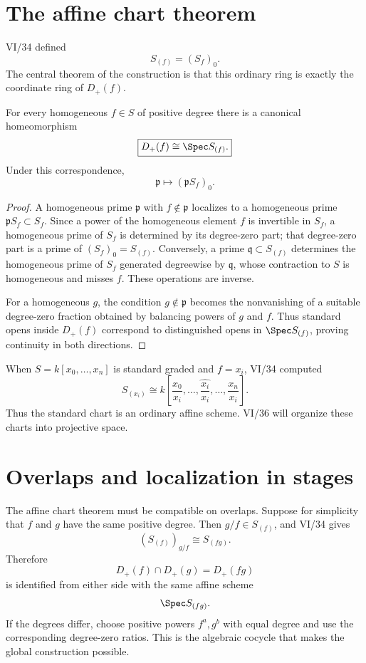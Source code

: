 \section{The affine chart theorem}
VI/34 defined
\[
S_{(f)}=(S_f)_0.
\]
The central theorem of the construction is that this ordinary ring is exactly the coordinate ring of \(D_+(f)\).

\begin{theorem}\label{thm:vi35-affine-chart}
For every homogeneous \(f\in S\) of positive degree there is a canonical homeomorphism
\[
\boxed{D_+(f)\cong\Spec S_{(f)}.}
\]
Under this correspondence,
\[
\mathfrak p\longmapsto (\mathfrak p S_f)_0.
\]
\end{theorem}

\begin{proof}
A homogeneous prime \(\mathfrak p\) with \(f\notin\mathfrak p\) localizes to a homogeneous prime \(\mathfrak pS_f\subset S_f\).  Since a power of the homogeneous element \(f\) is invertible in \(S_f\), a homogeneous prime of \(S_f\) is determined by its degree-zero part; that degree-zero part is a prime of \((S_f)_0=S_{(f)}\).  Conversely, a prime \(\mathfrak q\subset S_{(f)}\) determines the homogeneous prime of \(S_f\) generated degreewise by \(\mathfrak q\), whose contraction to \(S\) is homogeneous and misses \(f\).  These operations are inverse.

For a homogeneous \(g\), the condition \(g\notin\mathfrak p\) becomes the nonvanishing of a suitable degree-zero fraction obtained by balancing powers of \(g\) and \(f\).  Thus standard opens inside \(D_+(f)\) correspond to distinguished opens in \(\Spec S_{(f)}\), proving continuity in both directions.
\end{proof}

When \(S=k[x_0,\ldots,x_n]\) is standard graded and \(f=x_i\), VI/34 computed
\[
S_{(x_i)}\cong k\!\left[\frac{x_0}{x_i},\ldots,\widehat{\frac{x_i}{x_i}},\ldots,\frac{x_n}{x_i}\right].
\]
Thus the standard chart is an ordinary affine scheme.  VI/36 will organize these charts into projective space.



\section{Overlaps and localization in stages}
The affine chart theorem must be compatible on overlaps.  Suppose for simplicity that \(f\) and \(g\) have the same positive degree.  Then \(g/f\in S_{(f)}\), and VI/34 gives
\[
(S_{(f)})_{g/f}\cong S_{(fg)}.
\]
Therefore
\[
D_+(f)\cap D_+(g)=D_+(fg)
\]
is identified from either side with the same affine scheme
\[
\Spec S_{(fg)}.
\]
If the degrees differ, choose positive powers \(f^a,g^b\) with equal degree and use the corresponding degree-zero ratios.  This is the algebraic cocycle that makes the global construction possible.

